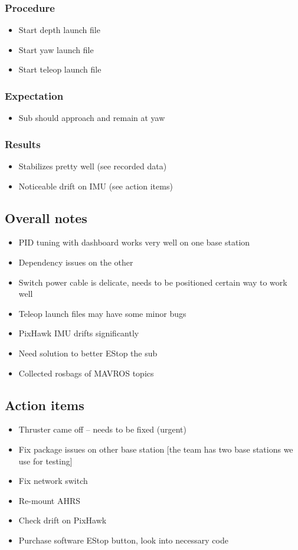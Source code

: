 \documentclass[conference]{IEEEtran}
\begin{document}
\subsubsection{Procedure}
\begin{itemize}
    \item Start depth launch file
    \item Start yaw launch file
    \item Start teleop launch file
\end{itemize}
\subsubsection{Expectation}
\begin{itemize}
    \item Sub should approach and remain at yaw
\end{itemize}
\subsubsection{Results}
\begin{itemize}
    \item Stabilizes pretty well (see recorded data)
    \item Noticeable drift on IMU (see action items)
\end{itemize}

\subsection{Overall notes}
\begin{itemize}
    \item PID tuning with dashboard works very well on one base station
    \item Dependency issues on the other
    \item Switch power cable is delicate, needs to be positioned certain way to work well
    \item Teleop launch files may have some minor bugs
    \item PixHawk IMU drifts significantly
    \item Need solution to better EStop the sub
    \item Collected rosbags of MAVROS topics
\end{itemize}

\subsection{Action items}
\begin{itemize}
    \item Thruster came off – needs to be fixed (urgent)
    \item Fix package issues on other base station [the team has two base stations we use for testing]
    \item Fix network switch
    \item Re-mount AHRS
    \item Check drift on PixHawk
    \item Purchase software EStop button, look into necessary code
\end{itemize}
\raggedbottom
\end{document}

